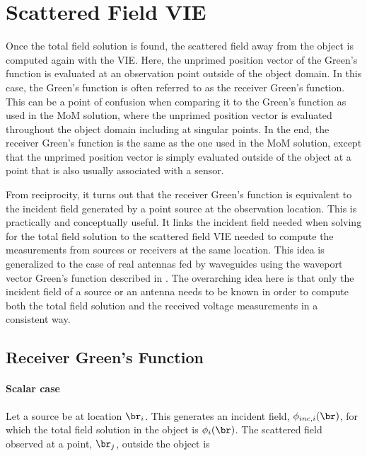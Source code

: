\clearpage
\newpage

\section{Scattered Field VIE}

Once the total field solution is found, the scattered field away from the object is computed again with the VIE. Here, the unprimed position vector of the Green's function is evaluated at an observation point outside of the object domain. In this case, the Green's function is often referred to as the receiver Green's function. This can be a point of confusion when comparing it to the Green's function as used in the MoM solution, where the unprimed position vector is evaluated throughout the object domain including at singular points. In the end, the receiver Green's function is the same as the one used in the MoM solution, except that the unprimed position vector is simply evaluated outside of the object at a point that is also usually associated with a sensor.

From reciprocity, it turns out that the receiver Green's function is equivalent to the incident field generated by a point source at the observation location. This is practically and conceptually useful. It links the incident field needed when solving for the total field solution to the scattered field VIE needed to compute the measurements from sources or receivers at the same location. This idea is generalized to the case of real antennas fed by waveguides using the waveport vector Green's function described in \cite{haynes2012vector}. The overarching idea here is that only the incident field of a source or an antenna needs to be known in order to compute both the total field solution and the received voltage measurements in a consistent way. 

\subsection{Receiver Green's Function}
\paragraph{Scalar case}
Let a source be at location $\br_i$. This generates an incident field, $\phi_{inc,i}(\br)$, for which the total field solution in the object is $\phi_{i}(\br)$. The scattered field observed at a point, $\br_j$, outside the object is

